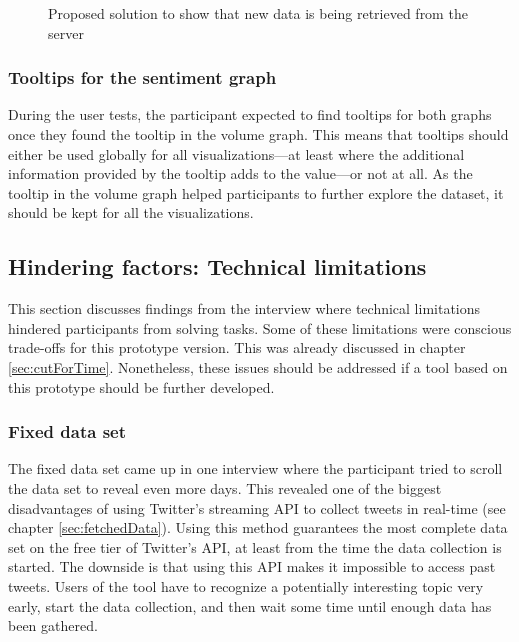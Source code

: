 \begin{figure}[htbp]
    \caption{Proposed solution to show that new data is being retrieved from the server}
    \label{fig:fetching_state}
\end{figure}

\subsubsection*{Tooltips for the sentiment graph}
During the user tests, the participant expected to find tooltips for both graphs once they found the tooltip in the volume graph. This means that tooltips should either be used globally for all visualizations---at least where the additional information provided by the tooltip adds to the value---or not at all. As the tooltip in the volume graph helped participants to further explore the dataset, it should be kept for all the visualizations.

\subsection{Hindering factors: Technical limitations}
This section discusses findings from the interview where technical limitations hindered participants from solving tasks. Some of these limitations were conscious trade-offs for this prototype version. This was already discussed in chapter \ref{sec:cutForTime}. Nonetheless, these issues should be addressed if a tool based on this prototype should be further developed.

\subsubsection*{Fixed data set}
The fixed data set came up in one interview where the participant tried to scroll the data set to reveal even more days. This revealed one of the biggest disadvantages of using Twitter's streaming API to collect tweets in real-time (see chapter \ref{sec:fetchedData}). Using this method guarantees the most complete data set on the free tier of Twitter's API, at least from the time the data collection is started. The downside is that using this API makes it impossible to access past tweets. Users of the tool have to recognize a potentially interesting topic very early, start the data collection, and then wait some time until enough data has been gathered.

